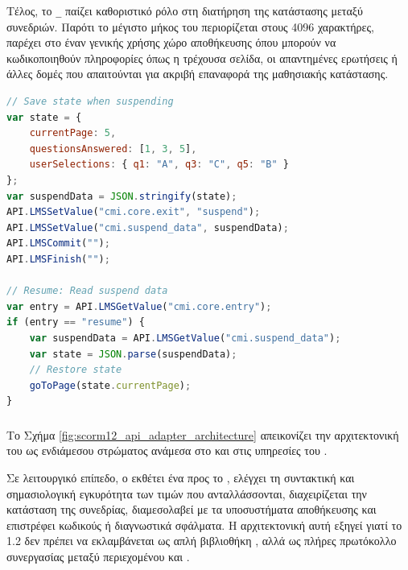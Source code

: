 Τέλος, το \texttt{\_} παίζει καθοριστικό ρόλο στη διατήρηση της κατάστασης μεταξύ συνεδριών. Παρότι το μέγιστο μήκος του περιορίζεται στους 4096 χαρακτήρες, παρέχει στο  έναν γενικής χρήσης χώρο αποθήκευσης όπου μπορούν να κωδικοποιηθούν πληροφορίες όπως η τρέχουσα σελίδα, οι απαντημένες ερωτήσεις ή άλλες δομές που απαιτούνται για ακριβή επαναφορά της μαθησιακής κατάστασης.

{\selectfont
\begin{lstlisting}[language=JavaScript, caption={Παράδειγμα \ENG{Suspend} \ENG{Data}}, label={lst:scorm12_suspend}]
// Save state when suspending
var state = {
    currentPage: 5,
    questionsAnswered: [1, 3, 5],
    userSelections: { q1: "A", q3: "C", q5: "B" }
};
var suspendData = JSON.stringify(state);
API.LMSSetValue("cmi.core.exit", "suspend");
API.LMSSetValue("cmi.suspend_data", suspendData);
API.LMSCommit("");
API.LMSFinish("");

// Resume: Read suspend data
var entry = API.LMSGetValue("cmi.core.entry");
if (entry == "resume") {
    var suspendData = API.LMSGetValue("cmi.suspend_data");
    var state = JSON.parse(suspendData);
    // Restore state
    goToPage(state.currentPage);
}
\end{lstlisting}
}

\subsubsection{  }

Το Σχήμα \ref{fig:scorm12_api_adapter_architecture} απεικονίζει την αρχιτεκτονική του  ως ενδιάμεσου στρώματος ανάμεσα στο  και στις υπηρεσίες του .



Σε λειτουργικό επίπεδο, ο  εκθέτει ένα  προς το , ελέγχει τη συντακτική και σημασιολογική εγκυρότητα των τιμών που ανταλλάσσονται, διαχειρίζεται την κατάσταση της συνεδρίας, διαμεσολαβεί με τα  υποσυστήματα αποθήκευσης και επιστρέφει κωδικούς ή διαγνωστικά σφάλματα. Η αρχιτεκτονική αυτή εξηγεί γιατί το  1.2 δεν πρέπει να εκλαμβάνεται ως απλή βιβλιοθήκη , αλλά ως πλήρες πρωτόκολλο συνεργασίας μεταξύ  περιεχομένου και .

